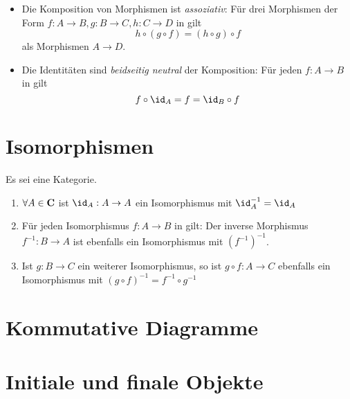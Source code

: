 \documentclass{article}
\begin{document}
\begin{defi}[Kategorie]
\begin{itemize}
				\item Die Komposition von Morphismen ist \emph{assoziativ}: F\"ur drei Morphismen der Form
				\begin{math}
					f: A \to B , g: B \to C, h:C \to D 
				\end{math}
				in \CatC gilt 
				\begin{displaymath}
					h \circ \left( g \circ f \right) = \left( h \circ g \right) \circ f
				\end{displaymath}
				als Morphismen
				\begin{math}
					A \to D.
				\end{math}
				\item Die Identit\"aten sind \emph{beidseitig neutral} \bzgl der Komposition: F\"ur jeden \Mor 
				\begin{math}
					f: A \to B
				\end{math}
				in \CatC gilt
				\begin{displaymath}
					f \circ \id_A = f = \id_B \circ f
				\end{displaymath}
			\end{itemize}
		\end{defi}
		\newpage
		\section{Isomorphismen}
		
		\begin{lem}
		   \cite[Lemma 2.3.9]{Bra}
		  Es sei \CatC eine Kategorie.
		  \begin{enumerate}
			  \item \( \forall A \in \mathbf{C} \) ist \( \id_A :A \to A  \) ein Isomorphismus mit \( \id_A^{-1}=\id_A \)
			  \item F\"ur jeden Isomorphismus \( f: A \to B \) in \CatC gilt: Der inverse Morphismus \(f^{-1}: B \to A \) ist ebenfalls ein Isomorphismus mit \( \left( f^{-1} \right)^{-1} \).
			  \item Ist \(g: B \to C \) ein weiterer Isomorphismus, so ist \( g \circ f :A \to C \) ebenfalls ein Isomorphismus mit \( \left( g \circ f \right)^{-1} =f^{-1} \circ g^{-1} \)  
		  \end{enumerate}
		  	\end{lem}
		  	
		\section{Kommutative Diagramme}
		
		 
		 \nocite{tikzcd}
		
		\section{Initiale und finale Objekte}
		 
		
		
		
				
\end{document}

